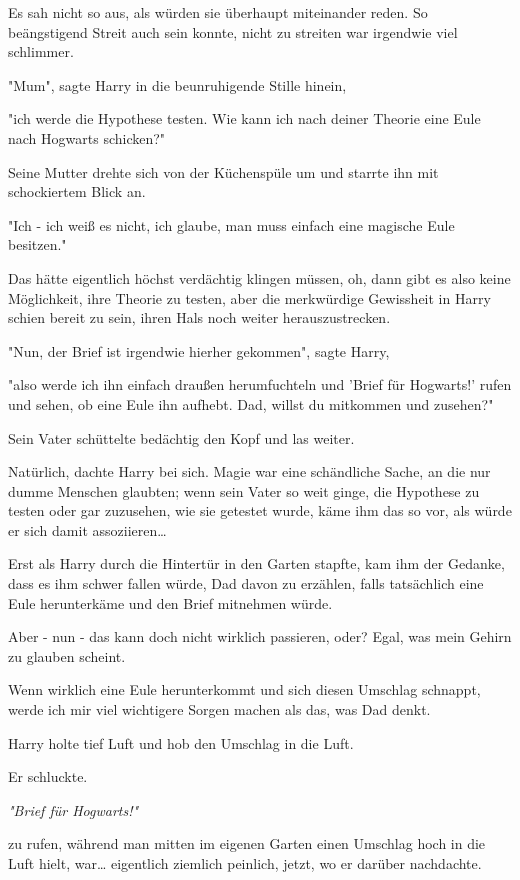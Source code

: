 {Es sah nicht so aus, als würden sie überhaupt miteinander reden. So beängstigend Streit auch sein konnte, nicht zu streiten war irgendwie viel schlimmer.

"Mum", sagte Harry in die beunruhigende Stille hinein,

"ich werde die Hypothese testen. Wie kann ich nach deiner Theorie eine Eule nach Hogwarts schicken?"

Seine Mutter drehte sich von der Küchenspüle um und starrte ihn mit schockiertem Blick an.

"Ich - ich weiß es nicht, ich glaube, man muss einfach eine magische Eule besitzen."

Das hätte eigentlich höchst verdächtig klingen müssen, oh, dann gibt es also keine Möglichkeit, ihre Theorie zu testen, aber die merkwürdige Gewissheit in Harry schien bereit zu sein, ihren Hals noch weiter herauszustrecken.

"Nun, der Brief ist irgendwie hierher gekommen", sagte Harry,

"also werde ich ihn einfach draußen herumfuchteln und 'Brief für Hogwarts!' rufen und sehen, ob eine Eule ihn aufhebt. Dad, willst du mitkommen und zusehen?"

Sein Vater schüttelte bedächtig den Kopf und las weiter.

Natürlich, dachte Harry bei sich. Magie war eine schändliche Sache, an die nur dumme Menschen glaubten; wenn sein Vater so weit ginge, die Hypothese zu testen oder gar zuzusehen, wie sie getestet wurde, käme ihm das so vor, als würde er sich damit assoziieren…

Erst als Harry durch die Hintertür in den Garten stapfte, kam ihm der Gedanke, dass es ihm schwer fallen würde, Dad davon zu erzählen, falls tatsächlich eine Eule herunterkäme und den Brief mitnehmen würde.

Aber - nun - das kann doch nicht wirklich passieren, oder? Egal, was mein Gehirn zu glauben scheint.

Wenn wirklich eine Eule herunterkommt und sich diesen Umschlag schnappt, werde ich mir viel wichtigere Sorgen machen als das, was Dad denkt.

Harry holte tief Luft und hob den Umschlag in die Luft.

Er schluckte.

\emph{"Brief für Hogwarts!"}

zu rufen, während man mitten im eigenen Garten einen Umschlag hoch in die Luft hielt, war… eigentlich ziemlich peinlich, jetzt, wo er darüber nachdachte.

}
